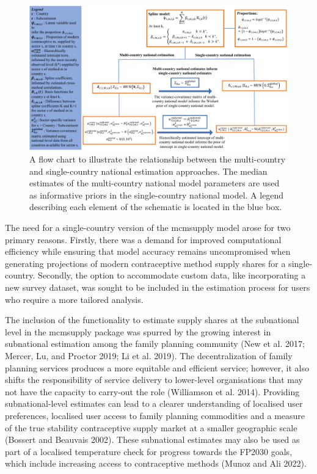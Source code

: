 \begin{figure}[H]
\includegraphics[width=1\linewidth,height=0.35\textheight]{figures/fig_1} \caption{A flow chart to illustrate the relationship between the multi-country and single-country national estimation approaches. The median estimates of the multi-country national model parameters are used as informative priors in the single-country national model. A legend describing each element of the schematic is located in the blue box.}\label{fig:fig-1}
\end{figure}

The need for a single-country version of the mcmsupply model arose for two primary reasons. Firstly, there was a demand for improved computational efficiency while ensuring that model accuracy remains uncompromised when generating projections of modern contraceptive method supply shares for a single-country. Secondly, the option to accommodate custom data, like incorporating a new survey dataset, was sought to be included in the estimation process for users who require a more tailored analysis.

The inclusion of the functionality to estimate supply shares at the subnational level in the mcmsupply package was spurred by the growing interest in subnational estimation among the family planning community (New et al. 2017; Mercer, Lu, and Proctor 2019; Li et al. 2019). The decentralization of family planning services produces a more equitable and efficient service; however, it also shifts the responsibility of service delivery to lower-level organisations that may not have the capacity to carry-out the role (Williamson et al. 2014). Providing subnational-level estimates can lead to a clearer understanding of localised user preferences, localised user access to family planning commodities and a measure of the true stability contraceptive supply market at a smaller geographic scale (Bossert and Beauvais 2002). These subnational estimates may also be used as part of a localised temperature check for progress towards the FP2030 goals, which include increasing access to contraceptive methods (Munoz and Ali 2022).

